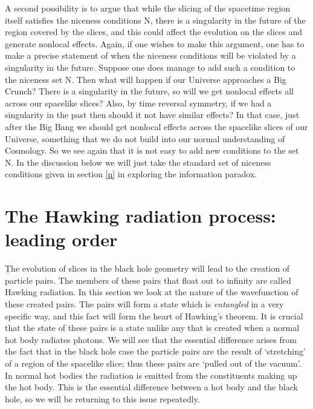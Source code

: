 \documentclass[12pt]{article}
\begin{document}
A second possibility is to argue that while the slicing of the spacetime region itself satisfies the niceness conditions N, there is a singularity in the future of the region covered by the slices, and this could affect the evolution on the slices and generate nonlocal effects. Again, if one wishes to make this argument, one has to make a precise statement of when the niceness conditions will be violated by a singularity in the future. Suppose one does manage to add such a condition to the niceness set N. Then what will happen if our Universe approaches a Big Crunch? There is a singularity in the future, so will we get nonlocal effects all across our spacelike slices? Also, by time reversal symmetry, if we had a singularity in the past then should it not have similar effects? In that case, just after the Big Bang we should get nonlocal effects across the spacelike slices of our Universe, something that we do not build into our normal understanding of Cosmology. So we see again that it is not easy to add new conditions to the set N. In the discussion below we will  just take the standard set of niceness conditions given in section \ref{n} in exploring the information paradox.


\section{The Hawking radiation process: leading order}\label{haw}

\b

The evolution of slices in the black hole geometry will lead to the creation of particle pairs. The members of these pairs that float out to infinity are called Hawking radiation. In this section we look at the nature of the wavefunction of these created pairs. The pairs will form a state which is {\it entangled} in a very specific way, and this fact will form the heart of Hawking's theorem. It is crucial that the state of these pairs is a state unlike any that is created when a normal hot body radiates photons. We will see that the essential difference arises from the fact that in the black hole case the particle pairs are the result of `stretching' of a region of the spacelike slice; thus these pairs are `pulled out of the vacuum'. In normal hot bodies the radiation is emitted from the constituents making up the hot body. This is the essential difference between a hot body and the black hole, so we will be returning to this issue repeatedly.
\end{document}
